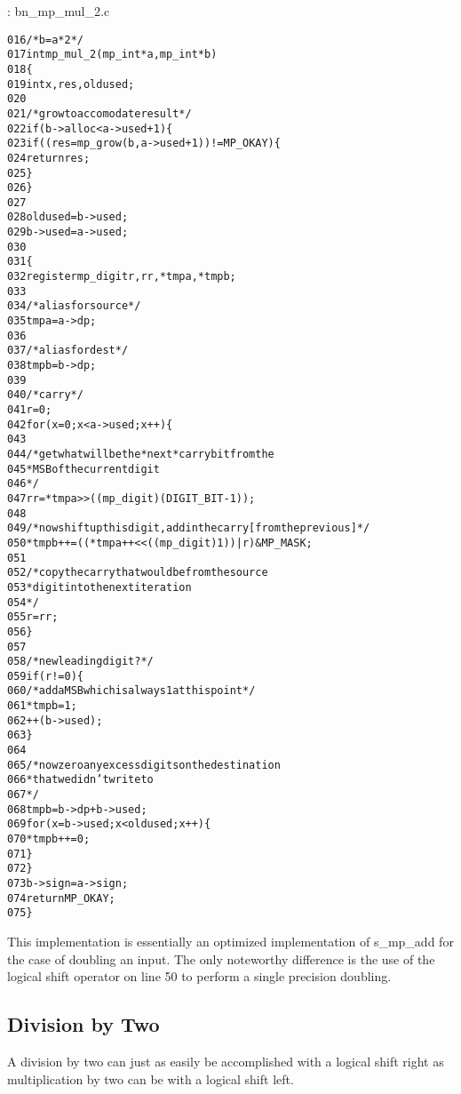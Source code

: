 \documentclass[b5paper]{book}
\begin{document}
\vspace{+3mm}\begin{small}
\hspace{-5.1mm}{\bf File}: bn\_mp\_mul\_2.c
\vspace{-3mm}
\begin{alltt}
016   /* b = a*2 */
017   int mp_mul_2(mp_int * a, mp_int * b)
018   \{
019     int     x, res, oldused;
020   
021     /* grow to accomodate result */
022     if (b->alloc < a->used + 1) \{
023       if ((res = mp_grow (b, a->used + 1)) != MP_OKAY) \{
024         return res;
025       \}
026     \}
027   
028     oldused = b->used;
029     b->used = a->used;
030   
031     \{
032       register mp_digit r, rr, *tmpa, *tmpb;
033   
034       /* alias for source */
035       tmpa = a->dp;
036       
037       /* alias for dest */
038       tmpb = b->dp;
039   
040       /* carry */
041       r = 0;
042       for (x = 0; x < a->used; x++) \{
043       
044         /* get what will be the *next* carry bit from the 
045          * MSB of the current digit 
046          */
047         rr = *tmpa >> ((mp_digit)(DIGIT_BIT - 1));
048         
049         /* now shift up this digit, add in the carry [from the previous] */
050         *tmpb++ = ((*tmpa++ << ((mp_digit)1)) | r) & MP_MASK;
051         
052         /* copy the carry that would be from the source 
053          * digit into the next iteration 
054          */
055         r = rr;
056       \}
057   
058       /* new leading digit? */
059       if (r != 0) \{
060         /* add a MSB which is always 1 at this point */
061         *tmpb = 1;
062         ++(b->used);
063       \}
064   
065       /* now zero any excess digits on the destination 
066        * that we didn't write to 
067        */
068       tmpb = b->dp + b->used;
069       for (x = b->used; x < oldused; x++) \{
070         *tmpb++ = 0;
071       \}
072     \}
073     b->sign = a->sign;
074     return MP_OKAY;
075   \}
\end{alltt}
\end{small}

This implementation is essentially an optimized implementation of s\_mp\_add for the case of doubling an input.  The only noteworthy difference
is the use of the logical shift operator on line 50 to perform a single precision doubling.  

\subsection{Division by Two}
A division by two can just as easily be accomplished with a logical shift right as multiplication by two can be with a logical shift left.
\end{document}
